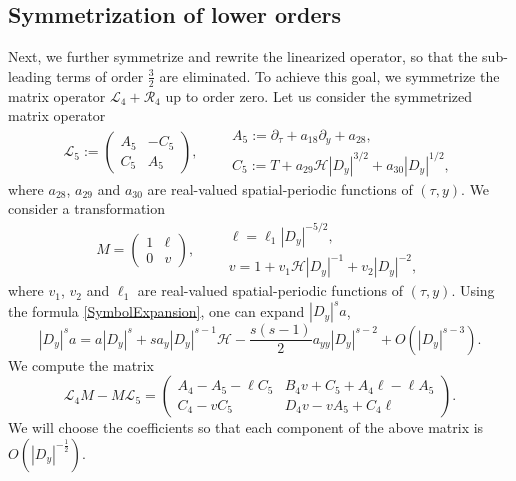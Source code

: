 \documentclass[12pt]{amsart}
\theoremstyle{remark}
\theoremstyle{definition}
\numberwithin{equation}{section}
\newcommand{\p}{\partial}
\newcommand{\f}{\frac}
\newcommand{\mH}{\mathcal{H}}
\newcommand{\mL}{\mathcal{L}}
\newcommand{\mR}{\mathcal{R}}
\begin{document}
\subsection{Symmetrization of lower orders}
Next, we further symmetrize and rewrite the linearized operator, so that the sub-leading terms of order $\f32$ are eliminated.
To achieve this goal, we symmetrize the matrix operator $\mL_4 + \mR_4$ up to order zero.
Let us consider the symmetrized matrix operator 
\begin{equation}  \label{symm mL5}
\mL_5 := \begin{pmatrix} 
A_5 &  - C_5 \\ 
C_5 & A_5 \end{pmatrix}, 
\qquad 
\begin{array}{l}
A_5 :=  \p_\tau + a_{18} \p_y + a_{28} ,  
 \\
C_5 := T + a_{29} \mH |D_y|^{3/2} + a_{30} |D_y|^{1/2},
\end{array}
\end{equation}
where $a_{28}$, $a_{29}$ and $a_{30}$ are real-valued spatial-periodic functions of $(\tau, y)$.
We consider a transformation 
\begin{equation} \label{MDef}
 M = \begin{pmatrix} 
1 &  \ell \\ 
0 & v \end{pmatrix}, 
\qquad 
\begin{array}{l}
\ell = \ell_1  |D_y|^{-5/2},  
 \\
 v =  1 + v_1 \mH |D_y|^{-1}+  v_2 |D_y|^{-2},
\end{array}
\end{equation}
where $v_1$, $v_2$ and $\ell_1$  are real-valued spatial-periodic functions of $(\tau, y)$.
Using the formula \eqref{SymbolExpansion}, one can expand $|D_y|^s a$,
\begin{equation*}
|D_y|^s a = a |D_y|^s + s a_y |D_y|^{s-1} \mH 
- \frac{s(s-1)}{2} a_{yy} |D_y|^{s-2} + O(|D_y|^{s-3}).
\end{equation*}
We compute the matrix
\begin{equation*}
 \mL_4 M -M\mL_5 = \begin{pmatrix} 
A_4 -A_5 -\ell C_5 &  B_4 v + C_5 + A_4 \ell - \ell A_5 \\ 
C_4 - v C_5 & D_4 v - vA_5 + C_4 \ell \end{pmatrix}.
\end{equation*}
We will choose the coefficients so that each component of the above matrix is $O(|D_y|^{-\f12})$.
\end{document}
